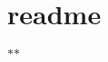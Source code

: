 \chapter{readme}
\hypertarget{a00013}{}\label{a00013}
\texorpdfstring{$\ast$}{*}\texorpdfstring{$\ast$}{*} 